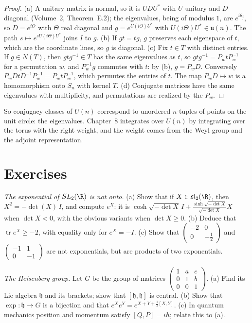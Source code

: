 \begin{proof}
(a) A unitary matrix is normal, so it is $UDU^*$ with $U$ unitary and $D$ diagonal (Volume~2, Theorem~E.2); the eigenvalues, being of modulus $1$, are $e^{i\theta_j}$, so $D=e^{i\Theta}$ with $\Theta$ real diagonal and
$g=e^{U(i\Theta)U^*}$ with $U(i\Theta)U^*\in\mathfrak u(n)$. The path $s\mapsto e^{sU(i\Theta)U^*}$ joins $I$ to $g$. (b) If $gt=tg$, $g$ preserves each eigenspace of $t$, which are the coordinate lines, so $g$ is
diagonal. (c) Fix $t\in T$ with distinct entries. If $g\in N(T)$, then $gtg^{-1}\in T$ has the same eigenvalues as $t$, so $gtg^{-1}=P_wtP_w^{-1}$ for a permutation $w$, and $P_w^{-1}g$ commutes with $t$: by (b), $g=P_wD$.
Conversely $P_wDtD^{-1}P_w^{-1}=P_wtP_w^{-1}$, which permutes the entries of $t$. The map $P_wD\mapsto w$ is a homomorphism onto $S_n$ with kernel $T$. (d) Conjugate matrices have the same eigenvalues with
multiplicity, and permutations are realized by the $P_w$.
\end{proof}

So conjugacy classes of $U(n)$ correspond to unordered $n$-tuples of points on the unit circle: the eigenvalues. Chapter~8 integrates over $U(n)$ by integrating over the torus with the right weight,
and the weight comes from the Weyl group and the adjoint representation.

\section{Exercises}

\begin{exercise}[$\star\star$]\label{ex:slexp}
\emph{The exponential of $SL_2(\R)$ is not onto.} (a) Show that if $X\in\mathfrak{sl}_2(\R)$, then $X^2=-\det(X)\,I$, and compute $e^X$: it is $\cosh\sqrt{-\det X}\,I+\frac{\sinh\sqrt{-\det X}}{\sqrt{-\det X}}X$ when $\det X<0$, with the obvious
variants when $\det X\ge0$. (b) Deduce that $\operatorname{tr}e^X\ge-2$, with equality only for $e^X=-I$. (c) Show that $\begin{pmatrix}-2&0\\0&-\frac12\end{pmatrix}$ and $\begin{pmatrix}-1&1\\0&-1\end{pmatrix}$ are not exponentials, but are products of two exponentials.
\end{exercise}

\begin{exercise}[$\star$]\label{ex:heisenberg}
\emph{The Heisenberg group.} Let $G$ be the group of matrices $\begin{pmatrix}1&a&c\\0&1&b\\0&0&1\end{pmatrix}$. (a) Find its Lie algebra $\mathfrak h$ and its brackets; show that $[\mathfrak h,\mathfrak h]$ is central. (b) Show that $\exp\colon\mathfrak h\to G$ is a
bijection and that $e^Xe^Y=e^{X+Y+\frac12[X,Y]}$. (c) In quantum mechanics position and momentum satisfy $[Q,P]=i\hbar$; relate this to (a).
\end{exercise}

